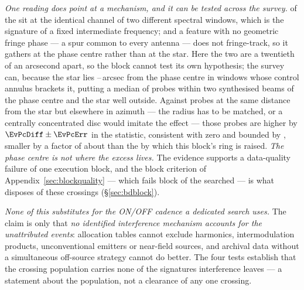 \emph{One reading does point at a mechanism, and it can be tested across the
survey.} \DqBlockIfMult{} of the \DqBlockNCross{} sit at the identical
channel of two different spectral windows, which is the signature of a fixed
intermediate frequency; and a feature with no geometric fringe phase --- a
spur common to every antenna --- does not fringe-track, so it gathers at the
phase centre rather than at the star. Here the two are a
twentieth of an arcsecond apart, so the block cannot test its own hypothesis;
the survey can, because the star lies \EvPcOffLo--\EvPcOffHi\,arcsec from the
phase centre in \EvPcNWin{} windows whose control annulus brackets it,
putting a median of \EvPcNNear{} probes within two synthesised beams of the
phase centre and the star well outside. Against probes at the same distance
from the star but elsewhere in azimuth --- the radius has to be matched, or a
centrally concentrated disc would imitate the effect --- those probes are
higher by $\EvPcDiff\pm\EvPcErr$ in the statistic, consistent with zero and
bounded by \EvPcBound, smaller by a factor of about \EvPcFactor{} than the
\EvPcNeed{} by which this block's ring is raised. \emph{The phase centre is
not where the excess lives.} The evidence supports a data-quality failure of
one execution block, and the block criterion of
Appendix~\ref{sec:blockquality} --- which fails \BqNFail{} block of the
\BqNBlocks{} searched --- is what disposes of these \EvNCrossFlag{} crossings
(\S\ref{sec:bdblock}).

\emph{None of this substitutes for the ON/OFF cadence a dedicated search
uses.} The claim is only that \emph{no
identified interference mechanism accounts for the unattributed events}:
allocation tables cannot exclude harmonics, intermodulation products,
unconventional emitters or near-field sources, and archival data without a
simultaneous off-source strategy cannot do better. The four tests establish
that the crossing population carries none of the signatures interference
leaves --- a statement about the population, not a clearance of any one
crossing.

